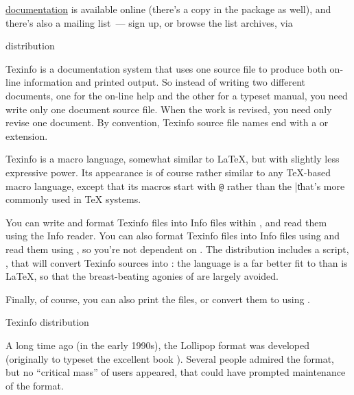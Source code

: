 \href{http://tug.org/docs/html/eplain}{\Eplain{} documentation} is
available online (there's a  copy in the 
package as well), and there's also a mailing list~--- sign up, or
browse the list archives, via
\begin{ctanrefs}
\item[\nothtml{\rmfamily}\Eplain{} distribution]
\end{ctanrefs}


Texinfo is a documentation system that uses one source file to produce
both on-line information and printed output.  So instead of writing
two different documents, one for the on-line help and the other for a
typeset manual, you need write only one document source file.  When
the work is revised, you need only revise one document.  By
convention, Texinfo source file names end with a  or
 extension.

Texinfo is a macro language, somewhat similar to \LaTeX{}, but with
slightly less expressive power.  Its appearance is of course rather
similar to any \TeX{}-based macro language, except that its macros
start with \texttt{@} rather than the |\| that's more commonly used in
\TeX{} systems.

You can write and format Texinfo files into Info files within 
, and read them using the  Info
reader.  You can also format Texinfo files into Info files using
 and read them using , so you're not
dependent on .  The distribution includes a
 script, , that will convert
Texinfo sources into : the language is a far better fit to
 than is \LaTeX{}, so that the breast-beating agonies of
 are largely
avoided.

Finally, of course, you can also print the files, or convert them to
 using \PDFTeX{}.
\begin{ctanrefs}
\item[\nothtml{\rmfamily}Texinfo distribution]
\end{ctanrefs}


A long time ago (in the early 1990s), the Lollipop \tex{} format was
developed (originally to typeset the excellent book %
).  Several people admired the
format, but no ``critical mass'' of users appeared, that could have
prompted maintenance of the format.

